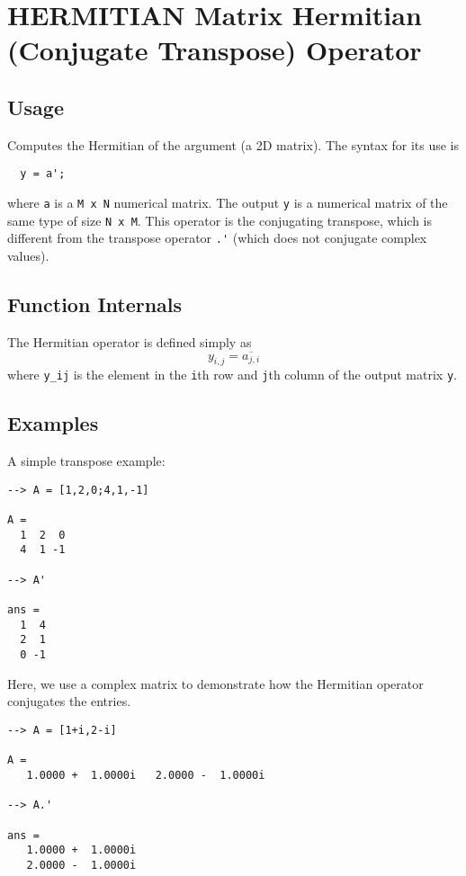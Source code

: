 \section{HERMITIAN Matrix Hermitian (Conjugate Transpose) Operator}

\subsection{Usage}

Computes the Hermitian of the argument (a 2D matrix).  The syntax for its use is
\begin{verbatim}
  y = a';
\end{verbatim}
where \verb|a| is a \verb|M x N| numerical matrix.  The output \verb|y| is a numerical matrix
of the same type of size \verb|N x M|.  This operator is the conjugating transpose,
which is different from the transpose operator \verb|.'| (which does not 
conjugate complex values).
\subsection{Function Internals}

The Hermitian operator is defined simply as
\[
  y_{i,j} = \overline{a_{j,i}}
\]
where \verb|y_ij| is the element in the \verb|i|th row and \verb|j|th column of the output matrix \verb|y|.
\subsection{Examples}

A simple transpose example:
\begin{verbatim}
--> A = [1,2,0;4,1,-1]

A = 
  1  2  0 
  4  1 -1 

--> A'

ans = 
  1  4 
  2  1 
  0 -1 
\end{verbatim}
Here, we use a complex matrix to demonstrate how the Hermitian operator conjugates the entries.
\begin{verbatim}
--> A = [1+i,2-i]

A = 
   1.0000 +  1.0000i   2.0000 -  1.0000i 

--> A.'

ans = 
   1.0000 +  1.0000i 
   2.0000 -  1.0000i 
\end{verbatim}

